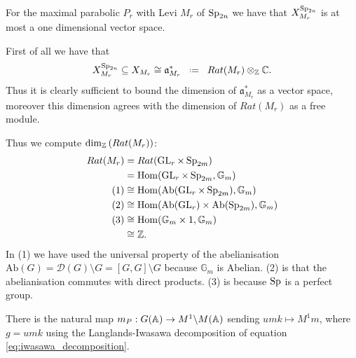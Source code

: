 \begin{example}\label{ex:characters}
    For the maximal parabolic \(P_r\) with Levi \(M_r\) of \(\operatorname{Sp}_{2n}\) we have that \( X_{M_r}^{\operatorname{Sp}_{2n}}\) is at most a one dimensional \C vector space. 

    First of all we have that \cite[I.1.4]{moeglinSpectralDecompositionEisenstein1995}
         \[ X_{M_r}^{\Sp_{2n}} \subseteq X_{M_r} \cong \mathfrak{a}_{M_r}^*\defeq Rat(M_r) \tensor_\Z \C.\]
        Thus it is clearly sufficient to bound the dimension of \(\mathfrak{a}_{M_r}^*\) as a \C vector space, moreover this dimension agrees with the dimension of \(Rat(M_r)\) as a free \Z module. 

        Thus we compute \(\dim_\Z(Rat(M_r))\):
        \begin{equation*}
            \begin{aligned}
                Rat(M_r) &= Rat(\GL_r \times \Sp_{2m}) \\
                         &= \Hom(\GL_r \times \Sp_{2m}, \mathbb{G}_m) \\
                         (1)&\cong \Hom(\mathrm{Ab}(\GL_r \times \Sp_{2m}), \mathbb{G}_m) \\
                         (2)&\cong \Hom(\mathrm{Ab}(\GL_r) \times \mathrm{Ab}(\Sp_{2m}), \mathbb{G}_m) \\
                         (3)&\cong \Hom(\mathbb{G}_m \times 1, \mathbb{G}_m) \\
                         &\cong \Z.
            \end{aligned}
        \end{equation*}
        In (1) we have used the universal property of the abelianisation \(\mathrm{Ab}(G) = \mathcal{D}(G) \setminus G = [G, G] \setminus G \) because \(\mathbb{G}_m\) is Abelian. (2) is that the abelianisation commutes with direct products. (3) is because \(\operatorname{Sp}\) is a perfect group.
\end{example}


There is the natural map \(m_P: G(\A) \to M^1 \backslash M(\A)\) sending \(umk \mapsto M^1 m\), where \(g = umk\) using the Langlands-Iwasawa decomposition of equation \ref{eq:iwasawa_decomposition}.

